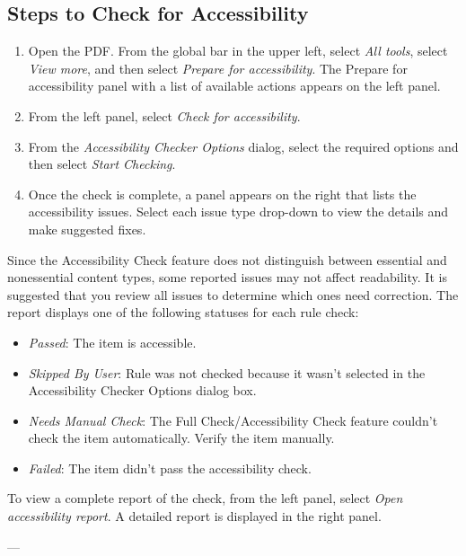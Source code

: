 \subsection{Steps to Check for Accessibility}
\begin{enumerate}
    \item Open the PDF. From the global bar in the upper left, select \emph{All tools}, select \emph{View more}, and then select \emph{Prepare for accessibility}. The Prepare for accessibility panel with a list of available actions appears on the left panel.
    \item From the left panel, select \emph{Check for accessibility}.
    \item From the \emph{Accessibility Checker Options} dialog, select the required options and then select \emph{Start Checking}.
    \item Once the check is complete, a panel appears on the right that lists the accessibility issues. Select each issue type drop-down to view the details and make suggested fixes.
\end{enumerate}

Since the Accessibility Check feature does not distinguish between essential and nonessential content types, some reported issues may not affect readability. It is suggested that you review all issues to determine which ones need correction. The report displays one of the following statuses for each rule check\footnotemark[1]:
\begin{itemize}
    \item \emph{Passed}: The item is accessible.
    \item \emph{Skipped By User}: Rule was not checked because it wasn't selected in the Accessibility Checker Options dialog box.
    \item \emph{Needs Manual Check}: The Full Check/Accessibility Check feature couldn't check the item automatically. Verify the item manually.
    \item \emph{Failed}: The item didn't pass the accessibility check.
\end{itemize}
To view a complete report of the check, from the left panel, select \emph{Open accessibility report}. A detailed report is displayed in the right panel.

---

